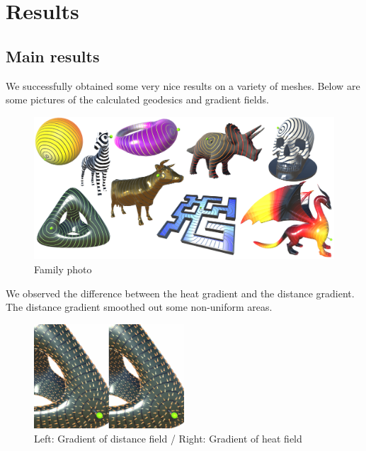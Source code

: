 \documentclass[a4paper,12pt,twoside]{article}
\begin{document}
\section{Results}

\subsection{Main results}

We successfully obtained some very nice results on a variety of meshes. Below are some pictures of the calculated geodesics and gradient fields.

\begin{figure}[htb]
	\centering
	\includegraphics[width=\textwidth]{P4.png}
	\caption{Family photo}
\end{figure}

We observed the difference between the heat gradient and the distance gradient. The distance gradient smoothed out some non-uniform areas.

\begin{figure}[htb]
	\centering
	\includegraphics[width=0.5\textwidth]{P2.png}
	\caption{Left: Gradient of distance field / Right: Gradient of heat field}
\end{figure}

\end{document}
